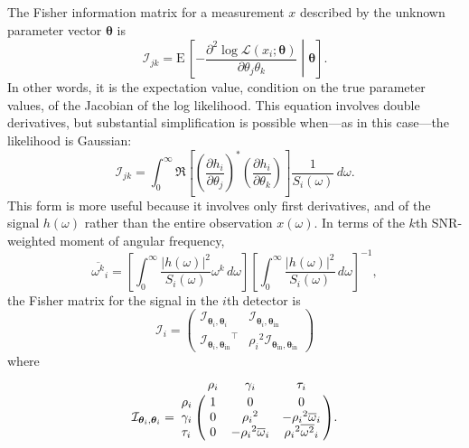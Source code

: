 \documentclass[amsmath,amssymb,aps,prx,reprint,nopreprintnumbers,nofootinbib]{revtex4-1}
\begin{document}
The Fisher information matrix for a measurement $x$ described by the unknown parameter vector $\bm{\theta}$ is
%
\begin{equation}\label{eq:general-fisher-matrix}
    \mathcal{I}_{jk} = \mathrm{E} \, \left[
        -\frac{\partial^2 \log
            \mathcal{L}(x_i ; \bm\theta)}
            {\partial \theta_j \theta_k}
    \middle| \bm\theta
    \right].
\end{equation}
%
In other words, it is the expectation value, condition on the true parameter values, of the Jacobian of the log likelihood. This equation involves double derivatives, but substantial simplification is possible when---as in this case---the likelihood is Gaussian:
%
\begin{equation}\label{eq:gaussian-fisher-matrix}
    \mathcal{I}_{jk} = \int_0^\infty \Re \left[
        \left(\frac{\partial h_i}{\partial \theta_j}\right)^*
        \left(\frac{\partial h_i}{\partial \theta_k}\right)
    \right] \frac{1}{S_i(\omega)} \, d\omega.
\end{equation}
%
This form is more useful because it involves only first derivatives, and of the signal $h (\omega)$ rather than the entire observation $x (\omega)$. In terms of the $k$th \ac{SNR}-weighted moment of angular frequency,
%
\begin{equation}\label{eq:angular-frequency-moments}
    {\overline{\omega^k}}_i =
        \left[ \int_0^\infty \frac{|h (\omega)|^2}{S_i(\omega)} \omega^k \, d\omega \right]
        \left[ \int_0^\infty \frac{|h (\omega)|^2}{S_i(\omega)} \, d\omega \right]^{-1},
\end{equation}
%
the Fisher matrix for the signal in the $i$th detector is
%
\begin{equation}
    \mathcal{I}_i = \left(
        \begin{array}{cc}
            \mathcal{I}_{\bm\theta_i,\bm\theta_i} &
            \mathcal{I}_{\bm\theta_i,\bm\theta_\mathrm{in}} \\
            {\mathcal{I}_{\bm\theta_i,\bm\theta_\mathrm{in}}}^\intercal &
            {\rho_i}^2 \mathcal{I}_{\bm\theta_\mathrm{in},\bm\theta_\mathrm{in}}
        \end{array}
    \right)
\end{equation}
%
where
%
\begin{equation}\label{eq:fisher-matrix}
    \mathcal{I}_{\bm\theta_i,\bm\theta_i} = \bordermatrix{
        ~ & \rho_i & \gamma_i & \tau_i \cr
        \rho_i & 1 & 0 & 0 \cr
        \gamma_i & 0 & {\rho_i}^2 & -{\rho_i}^2 {\overline{\omega}}_i \cr
        \tau_i & 0 & -{\rho_i}^2 {\overline{\omega}}_i & {\rho_i}^2 {\overline{\omega^2}}_i
    }.
\end{equation}
\end{document}
